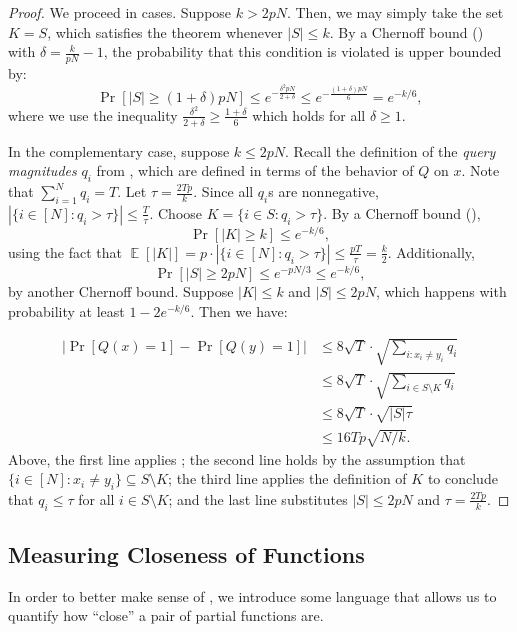 \documentclass[10pt,a4paper]{article}
\newcommand{\E}{\mathop{\mathbb{E}}}
\begin{document}
\begin{proof}
We proceed in cases. Suppose $k > 2pN$. Then, we may simply take the set $K = S$, which satisfies the theorem whenever $|S| \le k$. By a Chernoff bound () with $\delta = \frac{k}{pN} - 1$, the probability that this condition is violated is upper bounded by:
\[
\Pr\left[|S| \ge (1 + \delta)pN\right] \le e^{-\frac{\delta^2 pN}{2 + \delta}} \le e^{-\frac{(1 + \delta) pN}{6}} = e^{-k/6},
\]
where we use the inequality $\frac{\delta^2}{2+\delta} \ge \frac{1 + \delta}{6}$ which holds for all $\delta \ge 1$.

In the complementary case, suppose $k \le 2pN$. Recall the definition of the \textit{query magnitudes} $q_i$ from , which are defined in terms of the behavior of $Q$ on $x$. Note that $\sum_{i=1}^N q_i = T$. Let $\tau = \frac{2Tp}{k}$. Since all $q_i$s are nonnegative, $|\{i \in [N] : q_i > \tau\}| \le \frac{T}{\tau}$. Choose $K = \{i \in S : q_i > \tau\}$. By a Chernoff bound (),
\[ \Pr\left[ |K| \ge k \right] \le e^{-k/6}, \]
using the fact that $\E\left[ \left|K\right| \right] = p \cdot |\{i \in [N] : q_i > \tau\}| \le \frac{p T}{\tau} = \frac{k}{2}$. Additionally,
\[ \Pr\left[ |S| \ge 2p N \right] \le e^{-p N/3} \le e^{-k/6}, \]
by another Chernoff bound. Suppose $|K| \le k$ and $|S| \le 2p N$, which happens with probability at least $1 - 2e^{-k/6}$. Then we have:

\begin{align*}
\left|\Pr\left[Q(x) = 1 \right] - \Pr\left[Q(y) = 1 \right] \right| & \le 8\sqrt{T} \cdot \sqrt{\sum_{i : x_i \neq y_i} q_i}\\
&\le 8\sqrt{T} \cdot \sqrt{\sum_{i \in S \setminus K} q_i}\\
&\le 8\sqrt{T} \cdot \sqrt{|S| \tau}\\
&\le 16Tp\sqrt{N/k}.
\end{align*}
Above, the first line applies ; the second line holds by the assumption that $\{i \in [N] : x_i \neq y_i\} \subseteq S \setminus K$; the third line applies the definition of $K$ to conclude that $q_i \le \tau$ for all $i \in S \setminus K$; and the last line substitutes $|S| \le 2pN$ and $\tau = \frac{2Tp}{k}$.
\end{proof}


\subsection{Measuring Closeness of Functions}
\label{sec:closeness}
In order to better make sense of , we introduce some language that allows us to quantify how ``close'' a pair of partial functions are.
\end{document}
